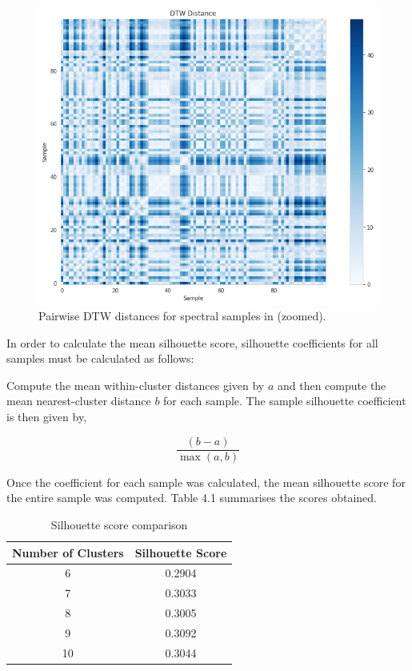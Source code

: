 \begin{figure}[!htb]
\centering
\includegraphics[scale=0.60]{figures/dtw cotar zoomed.png}
\caption{Pairwise DTW distances for spectral samples in\citet{vcotar2021galah} (zoomed).}
\end{figure}

In order to calculate the mean silhouette score, silhouette coefficients for all samples must be calculated as follows:

Compute the mean within-cluster distances given by $a$ and then compute the mean nearest-cluster distance $b$ for each sample. The sample silhouette coefficient is then given by,

\begin{equation}
\frac{(b-a)}{\max_{}(a,b)}
\end{equation}

Once the coefficient for each sample was calculated, the mean silhouette score for the entire sample was computed. Table 4.1 summarises the scores obtained.

\begin{table}[]
\begin{center}
\begin{tabular}{|c|c|}
\hline
\textbf{Number of Clusters} & \textbf{Silhouette Score} \\ \hline
6                     & 0.2904                    \\ \hline
7                     & 0.3033                    \\ \hline
8                     & 0.3005                    \\ \hline
9                     & 0.3092                    \\ \hline
10                    & 0.3044                    \\ \hline
\end{tabular}
\caption{Silhouette score comparison}
\label{table:Silhouette Score}
\end{center}
\end{table}

